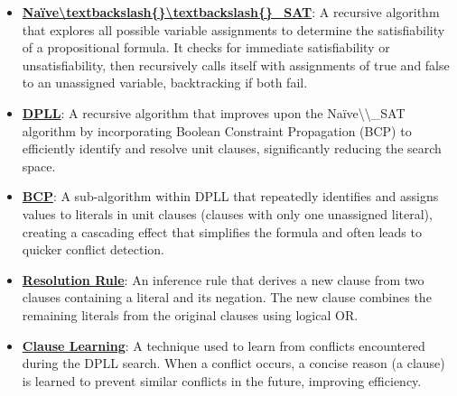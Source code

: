 \documentclass{article}%
\begin{document}
\begin{itemize}[leftmargin=*]%
\item \href{https://purdue.brightspace.com/d2l/common/assets/pdfjs-d2l-dist/1.0.14-legacy/web/viewer.html?file=\%2Fcontent\%2Fenforced\%2F1095467-wl.202510.CS.24300.001\%2F15L2-SAT.pdf\%3Fou\%3D1095467\&lang=en-us\&container=d2l-fileviewer-rendered-pdf\&fullscreen=d2l-fileviewer-rendered-pdf-dialog\&height=667#page=18}{\textbf{Naïve\textbackslash{}textbackslash\{\}\textbackslash{}textbackslash\{\}\_SAT}}: A recursive algorithm that explores all possible variable assignments to determine the satisfiability of a propositional formula. It checks for immediate satisfiability or unsatisfiability, then recursively calls itself with assignments of true and false to an unassigned variable, backtracking if both fail.%
\item \href{https://purdue.brightspace.com/d2l/common/assets/pdfjs-d2l-dist/1.0.14-legacy/web/viewer.html?file=\%2Fcontent\%2Fenforced\%2F1095467-wl.202510.CS.24300.001\%2F15L2-SAT.pdf\%3Fou\%3D1095467\&lang=en-us\&container=d2l-fileviewer-rendered-pdf\&fullscreen=d2l-fileviewer-rendered-pdf-dialog\&height=667#page=17}{\textbf{DPLL}}: A recursive algorithm that improves upon the Naïve\textbackslash{}\textbackslash{}_SAT algorithm by incorporating Boolean Constraint Propagation (BCP) to efficiently identify and resolve unit clauses, significantly reducing the search space.%
\item \href{https://purdue.brightspace.com/d2l/common/assets/pdfjs-d2l-dist/1.0.14-legacy/web/viewer.html?file=\%2Fcontent\%2Fenforced\%2F1095467-wl.202510.CS.24300.001\%2F15L2-SAT.pdf\%3Fou\%3D1095467\&lang=en-us\&container=d2l-fileviewer-rendered-pdf\&fullscreen=d2l-fileviewer-rendered-pdf-dialog\&height=667#page=20}{\textbf{BCP}}: A sub-algorithm within DPLL that repeatedly identifies and assigns values to literals in unit clauses (clauses with only one unassigned literal), creating a cascading effect that simplifies the formula and often leads to quicker conflict detection.%
\item \href{https://purdue.brightspace.com/d2l/common/assets/pdfjs-d2l-dist/1.0.14-legacy/web/viewer.html?file=\%2Fcontent\%2Fenforced\%2F1095467-wl.202510.CS.24300.001\%2F15L2-SAT.pdf\%3Fou\%3D1095467\&lang=en-us\&container=d2l-fileviewer-rendered-pdf\&fullscreen=d2l-fileviewer-rendered-pdf-dialog\&height=667#page=32}{\textbf{Resolution Rule}}: An inference rule that derives a new clause from two clauses containing a literal and its negation. The new clause combines the remaining literals from the original clauses using logical OR.%
\item \href{https://purdue.brightspace.com/d2l/common/assets/pdfjs-d2l-dist/1.0.14-legacy/web/viewer.html?file=\%2Fcontent\%2Fenforced\%2F1095467-wl.202510.CS.24300.001\%2F15L2-SAT.pdf\%3Fou\%3D1095467\&lang=en-us\&container=d2l-fileviewer-rendered-pdf\&fullscreen=d2l-fileviewer-rendered-pdf-dialog\&height=667#page=35}{\textbf{Clause Learning}}: A technique used to learn from conflicts encountered during the DPLL search. When a conflict occurs, a concise reason (a clause) is learned to prevent similar conflicts in the future, improving efficiency.%
\end{itemize}%
\end{document}
